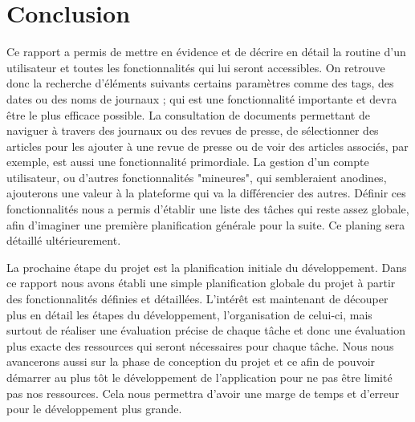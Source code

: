 \section{Conclusion}
\label{sec:conc}

Ce rapport a permis de mettre en évidence et de décrire en détail la routine d'un utilisateur et toutes les fonctionnalités qui lui seront accessibles. On retrouve donc la recherche d'éléments suivants certains paramètres comme des tags, des dates ou des noms de journaux ; qui est une fonctionnalité importante et devra être le plus efficace possible. La consultation de documents permettant de naviguer à travers des journaux ou des revues de presse, de sélectionner des articles pour les ajouter à une revue de presse ou de voir des articles associés, par exemple, est aussi une fonctionnalité primordiale. La gestion d'un compte utilisateur, ou d'autres fonctionnalités "mineures", qui sembleraient anodines, ajouterons une valeur à la plateforme qui va la différencier des autres. Définir ces fonctionnalités nous a permis d'établir une liste des tâches qui reste assez globale, afin d'imaginer une première planification générale pour la suite. Ce planing sera détaillé ultérieurement.

La prochaine étape du projet est la planification initiale du développement. Dans ce rapport nous avons établi une simple planification globale du projet à partir des fonctionnalités définies et détaillées. L'intérêt est maintenant de découper plus en détail les étapes du développement, l'organisation de celui-ci, mais surtout de réaliser une évaluation précise de chaque tâche et donc une évaluation plus exacte des ressources qui seront nécessaires pour chaque tâche. Nous nous avancerons aussi sur la phase de conception du projet et ce afin de pouvoir démarrer au plus tôt le développement de l'application pour ne pas être limité pas nos ressources. Cela nous permettra d'avoir une marge de temps et d'erreur pour le développement plus grande.